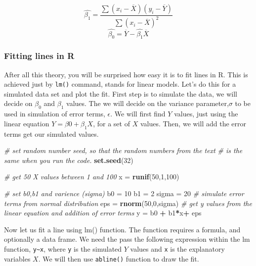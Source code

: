\documentclass[12pt,]{krantz}
\newenvironment{Shaded}{\begin{snugshade}}{\end{snugshade}}
\newcommand{\CommentTok}[1]{\textcolor[rgb]{0.56,0.35,0.01}{\textit{#1}}}
\newcommand{\DecValTok}[1]{\textcolor[rgb]{0.00,0.00,0.81}{#1}}
\newcommand{\KeywordTok}[1]{\textcolor[rgb]{0.13,0.29,0.53}{\textbf{#1}}}
\newcommand{\NormalTok}[1]{#1}
\newcommand{\OperatorTok}[1]{\textcolor[rgb]{0.81,0.36,0.00}{\textbf{#1}}}
\newcommand{\StringTok}[1]{\textcolor[rgb]{0.31,0.60,0.02}{#1}}
\begin{document}
\[\hat{\beta_1}=\frac{\sum{(x_i-\overline{X})(y_i-\overline{Y})}}{ \sum{(x_i-\overline{X})^2} }\]
\[\hat{\beta_0}=\overline{Y}-\hat{\beta_1}\overline{X}\]

\hypertarget{fitting-lines-in-r}{%
\subsubsection{Fitting lines in R}\label{fitting-lines-in-r}}

After all this theory, you will be surprised how easy it is to fit lines in R.
This is achieved just by \texttt{lm()} command, stands for linear models. Let's do this
for a simulated data set and plot the fit. First step is to simulate the
data, we will decide on \(\beta_0\) and \(\beta_1\) values. The we will decide
on the variance parameter,\(\sigma\) to be used in simulation of error terms,
\(\epsilon\). We will first find \(Y\) values, just using the linear equation
\(Y=\beta0+\beta_1X\), for
a set of \(X\) values. Then, we will add the error terms get our simulated values.

\begin{Shaded}
\begin{Highlighting}[]
\CommentTok{# set random number seed, so that the random numbers from the text}
\CommentTok{# is the same when you run the code.}
\KeywordTok{set.seed}\NormalTok{(}\DecValTok{32}\NormalTok{)}

\CommentTok{# get 50 X values between 1 and 100}
\NormalTok{x =}\StringTok{ }\KeywordTok{runif}\NormalTok{(}\DecValTok{50}\NormalTok{,}\DecValTok{1}\NormalTok{,}\DecValTok{100}\NormalTok{)}

\CommentTok{# set b0,b1 and varience (sigma)}
\NormalTok{b0 =}\StringTok{ }\DecValTok{10}
\NormalTok{b1 =}\StringTok{ }\DecValTok{2}
\NormalTok{sigma =}\StringTok{ }\DecValTok{20}
\CommentTok{# simulate error terms from normal distribution}
\NormalTok{eps =}\StringTok{ }\KeywordTok{rnorm}\NormalTok{(}\DecValTok{50}\NormalTok{,}\DecValTok{0}\NormalTok{,sigma)}
\CommentTok{# get y values from the linear equation and addition of error terms}
\NormalTok{y =}\StringTok{ }\NormalTok{b0 }\OperatorTok{+}\StringTok{ }\NormalTok{b1}\OperatorTok{*}\NormalTok{x}\OperatorTok{+}\StringTok{ }\NormalTok{eps}
\end{Highlighting}
\end{Shaded}

Now let us fit a line using lm() function. The function requires a formula, and
optionally a data frame. We need the pass the following expression within the
lm function, \texttt{y\textasciitilde{}x}, where \texttt{y} is the simulated \(Y\) values and \texttt{x} is the explanatory variables \(X\). We will then use \texttt{abline()} function to draw the fit.
\end{document}
